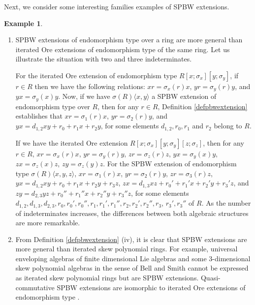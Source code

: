 \documentclass{amsart}
\theoremstyle{definition}
\newtheorem{example}[theorem]{Example}
\theoremstyle{remark}
\numberwithin{equation}{section}
\begin{document}
Next, we consider some interesting families examples of SPBW extensions.

\begin{example}\label{ExamplesSPBWextensionsDS}
\begin{enumerate}
\item [\rm (i)] SPBW extensions of endomorphism type over a ring are more general than iterated Ore extensions of endomorphism type of the same ring. Let us illustrate the situation with two and three indeterminates.
		
For the iterated Ore extension of endomorphism type $R[x;\sigma_x][y;\sigma_y]$, if $r\in R$ then we have the following relations: $xr = \sigma_x(r)x$, $yr = \sigma_y(r)y$, and $yx = \sigma_y(x)y$. Now, if we have $\sigma(R)\langle x, y\rangle$ a SPBW extension of endomorphism type over $R$, then for any $r\in R$, Definition \ref{defpbwextension} establishes that $xr=\sigma_1(r)x$, $yr=\sigma_2(r)y$, and $yx = d_{1,2}xy + r_0 + r_1x + r_2y$, for some elements $d_{1,2}, r_0, r_1$ and $r_2$ belong to $R$. 
	
If we have the iterated Ore extension $R[x;\sigma_x][y;\sigma_y][z;\sigma_z]$, then for any $r\in R$, $xr = \sigma_x(r)x$, $yr = \sigma_y(r)y$, $zr = \sigma_z(r)z$, $yx = \sigma_y(x)y$, $zx = \sigma_z(x)z$, $zy = \sigma_z(y)z$. For the SPBW extension of endomorphism type $\sigma(R)\langle x, y, z\rangle$, $xr=\sigma_1(r)x$, $yr=\sigma_2(r)y$, $zr = \sigma_3(r)z$, $yx = d_{1,2}xy + r_0 + r_1x + r_2y + r_3z$, $zx = d_{1,3}xz + r_0' + r_1'x + r_2'y + r_3'z$, and $zy = d_{2,3}yz + r_0'' + r_1''x + r_2''y + r_3''z$, for some elements $d_{1,2}, d_{1,3}, d_{2,3}, r_0, r_0', r_0'', r_1, r_1', r_1'', r_2, r_2', r_2'', r_3$, $r_3', r_3''$ of $R$. As the number of indeterminates increases, the differences between both algebraic structures are more remarkable.

\item [\rm (ii)] From Definition \ref{defpbwextension} (iv), it is clear that SPBW extensions are more general than iterated skew polynomial rings. For example, universal enveloping algebras of finite dimensional Lie algebras and some 3-dimensional skew polynomial algebras in the sense of Bell and Smith \cite{BellSmith1990} cannot be expressed as iterated skew polynomial rings but are SPBW extensions. Quasi-commutative SPBW extensions are isomorphic to iterated Ore extensions of endomorphism type \cite[ Theorem 2.3]{LezamaReyes2014}. 


\end{enumerate}
\end{example}
\end{document}
